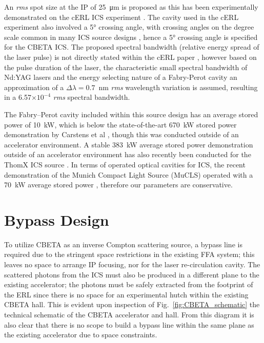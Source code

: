 \documentclass[../main.tex]{subfiles}
\begin{document}
An \textit{rms} spot size at the IP of 25~\si{\micro\meter} is proposed as this has been experimentally demonstrated on the cERL ICS experiment \cite{akagi2016narrow}. The cavity used in the cERL experiment also involved a 5\si{\degree} crossing angle, with crossing angles on the degree scale common in many ICS source designs \cite{faillace2019status,variola2014thomx}, hence a 5\si{\degree} crossing angle is specified for the CBETA ICS. The proposed spectral bandwidth (relative energy spread of the laser pulse) is not directly stated within the cERL paper \cite{akagi2016narrow}, however based on the pulse duration of the laser, the characteristic small spectral bandwidth of Nd:YAG lasers and the energy selecting nature of a Fabry-Perot cavity an approximation of a $\Delta \lambda = 0.7$~\si{\nano\meter} \cite{corner2019personal} \textit{rms} wavelength variation is assumed, resulting in a 6.57$\times 10^{-4}$ \textit{rms} spectral bandwidth.     

The Fabry--Perot cavity included within this source design has an average stored power of 10~\si{\kilo\watt}, which is below the state-of-the-art 670~\si{\kilo\watt} stored power demonstration by Carstens et al \cite{carstens2014megawatt}, though this was conducted outside of an accelerator environment. A stable 383~\si{\kilo\watt} average stored power demonstration outside of an accelerator environment has also recently been conducted for the ThomX ICS source \cite{liu2018optical}. In terms of operated optical cavities for ICS, the recent demonstration of the Munich Compact Light Source (MuCLS) operated with a 70~\si{\kilo\watt} average stored power \cite{eggl2016munich}, therefore our parameters are conservative. 

\section{Bypass Design}
\label{sec:bypass_design}

To utilize CBETA as an inverse Compton scattering source, a bypass line is required due to the stringent space restrictions in the existing FFA system; this leaves no space to arrange IP focusing, nor for the laser re-circulation cavity. The scattered photons from the ICS must also be produced in a different plane to the existing accelerator; the photons must be safely extracted from the footprint of the ERL since there is no space for an experimental hutch within the existing CBETA hall. This is evident upon inspection of Fig.~\ref{fig:CBETA_schematic} the technical schematic of the CBETA accelerator and hall. From this diagram it is also clear that there is no scope to build a bypass line within the same plane as the existing accelerator due to space constraints.
\end{document}
